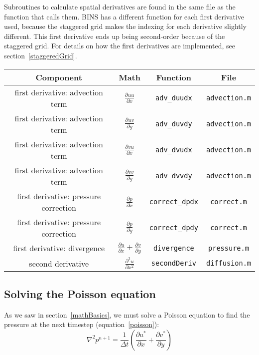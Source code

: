 \documentclass[12pt]{article}
\begin{document}
Subroutines to calculate spatial derivatives are found in the same file as the function that calls them.  BINS has a different function for each first derivative used, because the staggered grid makes the indexing for each derivative slightly different.  This first derivative ends up being second-order because of the staggered grid. For details on how the first derivatives are implemented, see section~\ref{staggeredGrid}.

\begin{center}
\begin{tabular}{|c|c|c|c|}
\hline 
\bf{Component} & \bf{Math} & \bf{Function} & \bf{File}\\ 
\hline 
first derivative: advection term & \Large{$\frac{\partial uu}{\partial x}$} & \texttt{adv\_duudx} & \texttt{advection.m}\\ 
\hline 
first derivative: advection term & \Large{$\frac{\partial uv}{\partial y}$} & \texttt{adv\_duvdy} & \texttt{advection.m}\\ 
\hline 
first derivative: advection term & \Large{$\frac{\partial vu}{\partial x}$} & \texttt{adv\_dvudx} & \texttt{advection.m}\\ 
\hline 
first derivative: advection term & \Large{$\frac{\partial vv}{\partial y}$} & \texttt{adv\_dvvdy} & \texttt{advection.m}\\ 
\hline 
first derivative: pressure correction & \Large{$\frac{\partial p}{\partial x}$} & \texttt{correct\_dpdx} & \texttt{correct.m}\\ 
\hline
first derivative: pressure correction & \Large{$\frac{\partial p}{\partial y}$} & \texttt{correct\_dpdy} & \texttt{correct.m}\\ 
\hline
first derivative: divergence & \Large{$\frac{\partial u}{\partial x} + \frac{\partial v}{\partial y}$} & \texttt{divergence} & \texttt{pressure.m}\\ 
\hline
second derivative & \Large{$\frac{\partial^2 u}{\partial x^2}$} & \texttt{secondDeriv} & \texttt{diffusion.m}\\ 
\hline 
\end{tabular} 
\end{center}

\subsection{Solving the Poisson equation}
\label{poissonSolve}
\renewcommand\arraystretch{1}
As we saw in section~\ref{mathBasics}, we must solve a Poisson equation to find the pressure at the next timestep (equation~\ref{poisson}):
\[\nabla^2 p^{n+1} = \frac{1}{\Delta t}\left( \frac{\partial u^*}{\partial x} + \frac{\partial v^*}{\partial y}\right)\]
\end{document}

